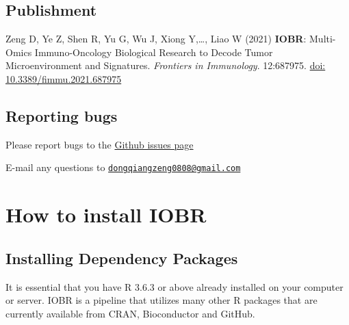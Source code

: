 \documentclass[
  12pt,
]{book}
\theoremstyle{definition}
\theoremstyle{definition}
\theoremstyle{definition}
\theoremstyle{definition}
\theoremstyle{remark}
\begin{document}
\hypertarget{publishment}{%
\section{Publishment}\label{publishment}}

Zeng D, Ye Z, Shen R, Yu G, Wu J, Xiong Y,\ldots, Liao W (2021) \textbf{IOBR}: Multi-Omics Immuno-Oncology Biological Research to Decode Tumor Microenvironment and Signatures. \emph{Frontiers in Immunology}. 12:687975. \href{https://www.frontiersin.org/articles/10.3389/fimmu.2021.687975/full}{doi: 10.3389/fimmu.2021.687975}

\hypertarget{reporting-bugs}{%
\section{Reporting bugs}\label{reporting-bugs}}

Please report bugs to the \href{https://github.com/IOBR/IOBR/issues}{Github issues page}

E-mail any questions to \href{mailto:dongqiangzeng0808@gmail.com}{\nolinkurl{dongqiangzeng0808@gmail.com}}

\hypertarget{how-to-install-iobr}{%
\chapter{How to install IOBR}\label{how-to-install-iobr}}

\hypertarget{installing-dependency-packages}{%
\section{Installing Dependency Packages}\label{installing-dependency-packages}}

It is essential that you have R 3.6.3 or above already installed on your computer or server. IOBR is a pipeline that utilizes many other R packages that are currently available from CRAN, Bioconductor and GitHub.
\end{document}
